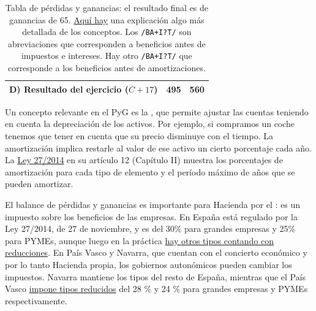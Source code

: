 \documentclass[nochap,palatino,shortheader]{apuntes}
\begin{document}
\begin{table}[hbtp]
\begin{minipage}{\textwidth}
\begin{tabular}{l|c|c}
\textbf{D) Resultado del ejercicio} ($C + 17$) & \textbf{495} & \textbf{560} \\ \bottomrule
\end{tabular}
\caption{Tabla de pérdidas y ganancias: el resultado final es de ganancias de 65. \href{http://www.plangeneralcontable.com/?tit=guia-del-pgc-de-pymes&name=GeTia&contentId=man_pgcpym&manPage=26}{Aquí hay} una explicación algo más detallada de los conceptos. Los \texttt{/BA+I?T/} son abreviaciones que corresponden a beneficios antes de impuestos e intereses. Hay otro \texttt{/BA+I?T/} que corresponde a los beneficios antes de amortizaciones.}
\label{tab:PyG}
\end{minipage}
\end{table}

Un concepto relevante en el PyG es la , que permite ajustar las cuentas teniendo en cuenta la depreciación de los activos. Por ejemplo, si compramos un coche tenemos que tener en cuenta que su precio disminuye con el tiempo. La amortización implica restarle al valor de ese activo un cierto porcentaje cada año. La \href{http://www.boe.es/diario_boe/txt.php?id=BOE-A-2014-12328}{Ley 27/2014} en su artículo 12 (Capítulo II) muestra los porcentajes de amortización para cada tipo de elemento y el período máximo de años que se pueden amortizar.

El balance de pérdidas y ganancias es importante para Hacienda por el : es un impuesto sobre los beneficios de las empresas. En España está regulado por la Ley 27/2014, de 27 de noviembre, y es del 30\% para grandes empresas y 25\% para PYMEs, aunque luego en la práctica \href{http://www.agenciatributaria.es/AEAT.internet/Inicio/_Segmentos_/Empresas_y_profesionales/Empresas/Impuesto_sobre_Sociedades/Periodos_impositivos_iniciados_hasta_31_12_2014/Tipos_de_gravamen_aplicables_a_periodos_impositivos_iniciados_en_el_ano_2013_y_2014.shtml}{hay otros tipos contando con reducciones}. En País Vasco y Navarra, que cuentan con el concierto económico y por lo tanto Hacienda propia, los gobiernos autonómicos pueden cambiar los impuestos. Navarra mantiene los tipos del resto de España, mientras que el País Vasco \href{http://www.ogasun.ejgv.euskadi.eus/r51-341/es/contenidos/informacion/6901/es_2316/es_12215.html}{impone tipos reducidos} del 28 \% y 24 \% para grandes empresas y PYMEs respectivamente.
\end{document}
